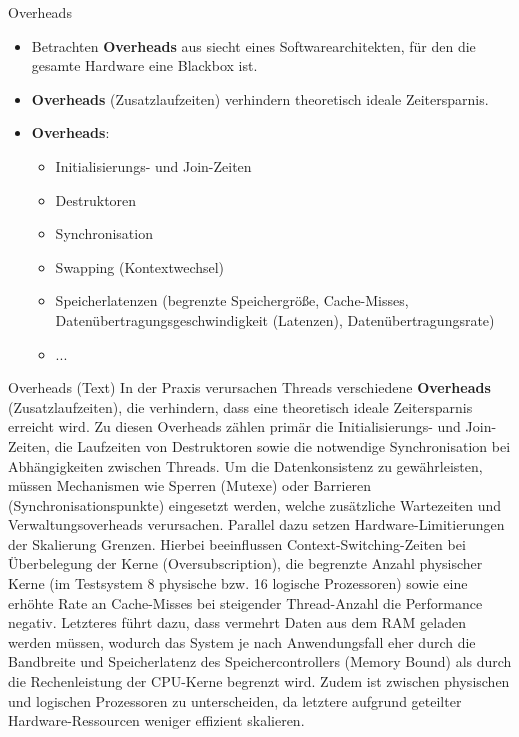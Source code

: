 \documentclass[10pt, ngerman]{beamer}
\begin{document}
\begin{frame}{Overheads}
    \begin{itemize}
        \item Betrachten \textbf{Overheads} aus siecht eines Softwarearchitekten, für den die gesamte Hardware eine Blackbox ist.
        \item \textbf{Overheads} (Zusatzlaufzeiten) verhindern theoretisch ideale Zeitersparnis.
        \item \textbf{Overheads}:
              \begin{itemize}
                  \item Initialisierungs- und Join-Zeiten
                  \item Destruktoren
                  \item Synchronisation
                  \item Swapping (Kontextwechsel)
                  \item Speicherlatenzen (begrenzte Speichergröße, Cache-Misses, Datenübertragungsgeschwindigkeit (Latenzen), Datenübertragungsrate)
                  \item ...
              \end{itemize}
    \end{itemize}
\end{frame}

\begin{frame}{Overheads (Text)}
    In der Praxis verursachen Threads verschiedene \textbf{Overheads} (Zusatzlaufzeiten), die verhindern, dass eine theoretisch ideale Zeitersparnis erreicht wird. Zu diesen Overheads zählen primär die Initialisierungs- und Join-Zeiten, die Laufzeiten von Destruktoren sowie die notwendige Synchronisation bei Abhängigkeiten zwischen Threads. Um die Datenkonsistenz zu gewährleisten, müssen Mechanismen wie Sperren (Mutexe) oder Barrieren (Synchronisationspunkte) eingesetzt werden, welche zusätzliche Wartezeiten und Verwaltungsoverheads verursachen. Parallel dazu setzen Hardware-Limitierungen der Skalierung Grenzen. Hierbei beeinflussen Context-Switching-Zeiten bei Überbelegung der Kerne (Oversubscription), die begrenzte Anzahl physischer Kerne (im Testsystem 8 physische bzw. 16 logische Prozessoren) sowie eine erhöhte Rate an Cache-Misses bei steigender Thread-Anzahl die Performance negativ. Letzteres führt dazu, dass vermehrt Daten aus dem RAM geladen werden müssen, wodurch das System je nach Anwendungsfall eher durch die Bandbreite und Speicherlatenz des Speichercontrollers (Memory Bound) als durch die Rechenleistung der CPU-Kerne begrenzt wird. Zudem ist zwischen physischen und logischen Prozessoren zu unterscheiden, da letztere aufgrund geteilter Hardware-Ressourcen weniger effizient skalieren.
\end{frame}
\end{document}
